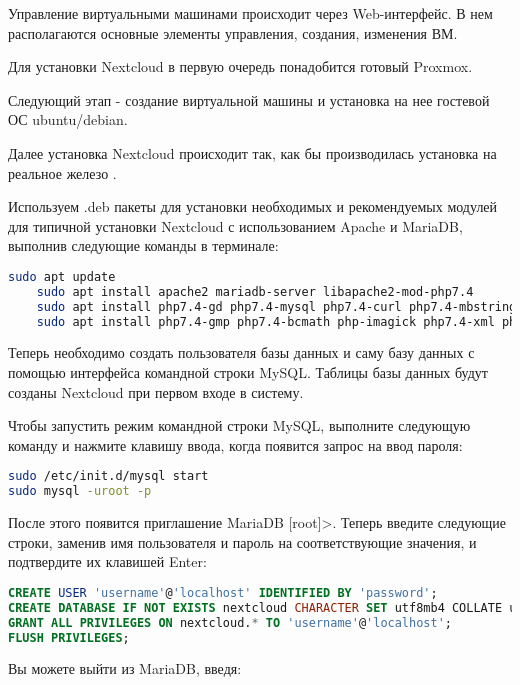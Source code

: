 Управление виртуальными машинами происходит через Web-интерфейс. В нем располагаются основные элементы управления, создания, изменения ВМ.


Для установки Nextcloud в первую очередь понадобится готовый Proxmox.

Следующий этап - создание виртуальной машины и установка на нее гостевой ОС ubuntu/debian.

Далее установка Nextcloud происходит так, как бы производилась установка на реальное железо \cite{nextcloud}.

Используем  .deb пакеты для установки необходимых и рекомендуемых модулей для типичной установки Nextcloud с использованием Apache и MariaDB, выполнив следующие команды в терминале:

\begin{lstlisting}[language=Bash]
    sudo apt update
    sudo apt install apache2 mariadb-server libapache2-mod-php7.4
    sudo apt install php7.4-gd php7.4-mysql php7.4-curl php7.4-mbstring php7.4-intl
    sudo apt install php7.4-gmp php7.4-bcmath php-imagick php7.4-xml php7.4-zip
\end{lstlisting}

Теперь необходимо создать пользователя базы данных и саму базу данных с помощью интерфейса командной строки MySQL. Таблицы базы данных будут созданы Nextcloud при первом входе в систему.

Чтобы запустить режим командной строки MySQL, выполните следующую команду и нажмите клавишу ввода, когда появится запрос на ввод пароля:

\begin{lstlisting}[language=Bash]
sudo /etc/init.d/mysql start
sudo mysql -uroot -p
\end{lstlisting}

После этого появится приглашение MariaDB [root]>. Теперь введите следующие строки, заменив имя пользователя и пароль на соответствующие значения, и подтвердите их клавишей Enter:

\begin{lstlisting}[language=sql]
CREATE USER 'username'@'localhost' IDENTIFIED BY 'password';
CREATE DATABASE IF NOT EXISTS nextcloud CHARACTER SET utf8mb4 COLLATE utf8mb4_general_ci;
GRANT ALL PRIVILEGES ON nextcloud.* TO 'username'@'localhost';
FLUSH PRIVILEGES;
\end{lstlisting}

Вы можете выйти из MariaDB, введя:

